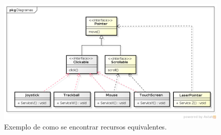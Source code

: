 \begin{figure}[ht]
	\center
	\includegraphics[scale=0.55]{imagens/tutorialDeEquivalencia}
	\caption{Exemplo de como se encontrar recursos equivalentes.}
	\label{fig:tutorialDeEquivalencia}
\end{figure}